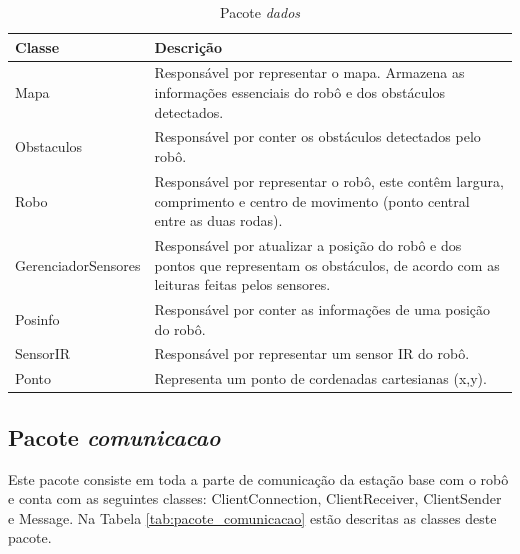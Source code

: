 \begin{table}[h]
  \centering
  \caption{Pacote \textit{dados}}
    \begin{tabular}{p{6cm}p{8cm}}
    \toprule
    \textbf{Classe} & \textbf{Descrição} \\ 
    \midrule
    Mapa  & Responsável por representar o mapa. Armazena as informações essenciais do robô e dos obstáculos detectados. \\ \hline
    Obstaculos & Responsável por conter os obstáculos detectados pelo robô. \\ \hline
    Robo  & Responsável por representar o robô, este contêm largura, comprimento e centro de movimento (ponto central entre as duas rodas). \\ \hline
    GerenciadorSensores & Responsável por atualizar a posição do robô e dos pontos que representam os obstáculos, de acordo com as leituras feitas pelos sensores. \\ \hline
    Posinfo & Responsável por conter as informações de uma posição do robô. \\ \hline
    SensorIR & Responsável por representar um sensor IR do robô. \\ \hline 
    Ponto & Representa um ponto de cordenadas cartesianas (x,y). \\ 
    \bottomrule
    \end{tabular}%
  \label{tab:pacote_controle}%
\end{table}%

\subsection{Pacote \textit{comunicacao}}

Este pacote consiste em toda a parte de comunicação da estação base com o robô e conta com as seguintes classes: ClientConnection, ClientReceiver, ClientSender e Message. Na Tabela \ref{tab:pacote_comunicacao} estão descritas as classes deste pacote.

